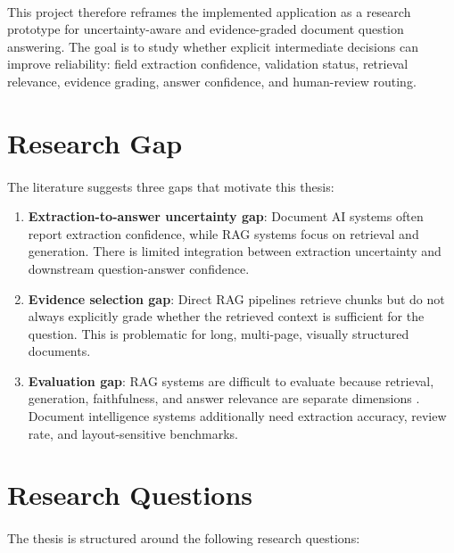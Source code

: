 \paragraph{} This project therefore reframes the implemented application as a research prototype for uncertainty-aware and evidence-graded document question answering. The goal is to study whether explicit intermediate decisions can improve reliability: field extraction confidence, validation status, retrieval relevance, evidence grading, answer confidence, and human-review routing.

\section{Research Gap}
\paragraph{} The literature suggests three gaps that motivate this thesis:

\begin{enumerate}
    \item \textbf{Extraction-to-answer uncertainty gap}: Document AI systems often report extraction confidence, while RAG systems focus on retrieval and generation. There is limited integration between extraction uncertainty and downstream question-answer confidence.
    \item \textbf{Evidence selection gap}: Direct RAG pipelines retrieve chunks but do not always explicitly grade whether the retrieved context is sufficient for the question. This is problematic for long, multi-page, visually structured documents.
    \item \textbf{Evaluation gap}: RAG systems are difficult to evaluate because retrieval, generation, faithfulness, and answer relevance are separate dimensions \cite{es2023ragas}. Document intelligence systems additionally need extraction accuracy, review rate, and layout-sensitive benchmarks.
\end{enumerate}

\section{Research Questions}
\paragraph{} The thesis is structured around the following research questions:

